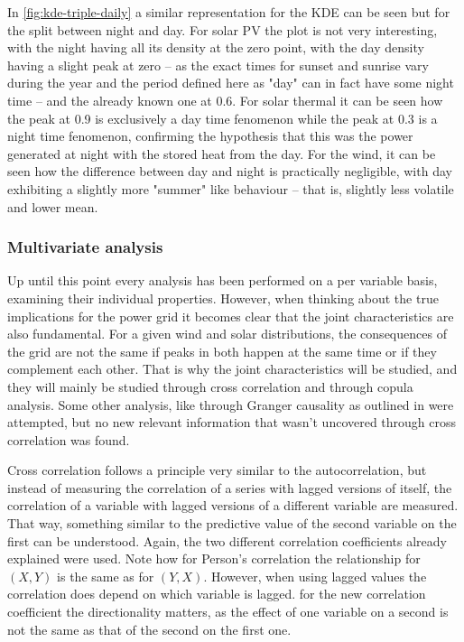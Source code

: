 In \autoref{fig:kde-triple-daily} a similar representation for the KDE can be seen but for the split between night and day. For solar PV the plot is not very interesting, with the night having all its density at the zero point, with the day density having a slight peak at zero -- as the exact times for sunset and sunrise vary during the year and the period defined here as "day" can in fact have some night time -- and the already known one at 0.6. For solar thermal it can be seen how the peak at 0.9 is exclusively a day time fenomenon while the peak at 0.3 is a night time fenomenon, confirming the hypothesis that this was the power generated at night with the stored heat from the day. For the wind, it can be seen how the difference between day and night is practically negligible, with day exhibiting a slightly more "summer" like behaviour -- that is, slightly less volatile and lower mean. 

\subsubsection{Multivariate analysis}
\label{sec:multivariate-analysis}
Up until this point every analysis has been performed on a per variable basis, examining their individual properties. However, when thinking about the true implications for the power grid it becomes clear that the joint characteristics are also fundamental. For a given wind and solar distributions, the consequences of the grid are not the same if peaks in both happen at the same time or if they complement each other. That is why the joint characteristics will be studied, and they will mainly be studied through cross correlation and through copula analysis. Some other analysis, like through Granger causality as outlined in \cite{granger_1969} were attempted, but no new relevant information that wasn't uncovered through cross correlation was found. 

Cross correlation follows a principle very similar to the autocorrelation, but instead of measuring the correlation of a series with lagged versions of itself, the correlation of a variable with lagged versions of a different variable are measured. That way, something similar to the predictive value of the second variable on the first can be understood. Again, the two different correlation coefficients already explained were used. Note how for Person's correlation the relationship for $\left(X,Y\right)$ is the same as for $\left(Y,X\right)$. However, when using lagged values the correlation does depend on which variable is lagged. for the new correlation coefficient the directionality matters, as the effect of one variable on a second is not the same as that of the second on the first one. 

